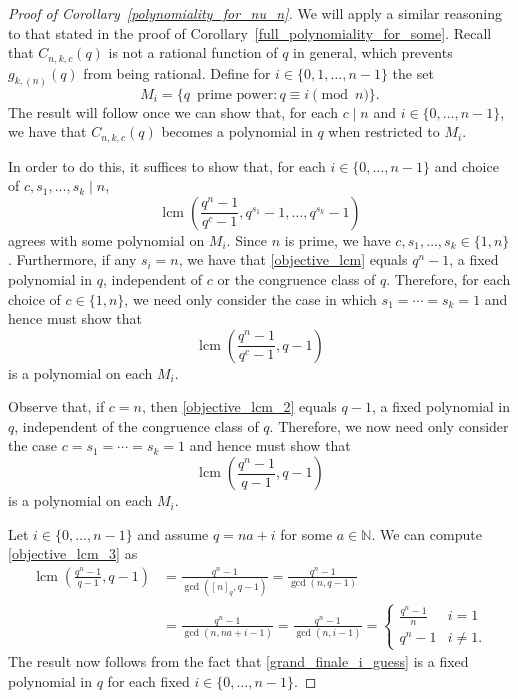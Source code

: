 \documentclass[10pt]{article}
\theoremstyle{definition}
\DeclareMathOperator{\lcm}{lcm}
\newcommand{\N}{\mathbb{N}}
\begin{document}
\begin{proof}[Proof of Corollary~\ref{polynomiality_for_nu_n}]
We will apply a similar reasoning to that stated in the proof of Corollary~\ref{full_polynomiality_for_some}.
Recall that \(C_{n,k,c}(q)\) is not a rational function of \(q\) in general,
which prevents \(g_{k,(n)} (q)\) from being rational.
Define for \(i \in \{0,1,\ldots,n-1\}\) the set
\begin{equation}
M_i = \{ q \, \text{ prime power} : q \equiv i \pmod{n}\}.
\end{equation}
The result will follow once we can show that, for each \(c \mid n\) and \(i \in \{0,\ldots,n-1\}\), we have that \(C_{n,k,c}(q)\) becomes a polynomial in \(q\) when restricted to \(M_i\).

In order to do this, it suffices to show that, for each \(i \in \{0,\ldots,n-1\}\) and choice of \(c, s_1,\ldots,s_k \mid n\),
\begin{equation}
\label{objective_lcm}
\lcm
\left (
\frac{q^n-1}{q^c-1},
q^{s_1} - 1,
\ldots,
q^{s_k} - 1
\right )
\end{equation}
agrees with some polynomial on \(M_i\).
Since \(n\) is prime, we have \(c,s_1,\ldots,s_k \in \{1,n\}\).
Furthermore, if any \(s_i = n\), we have that \eqref{objective_lcm} equals \(q^n-1\), a fixed polynomial in \(q\),
independent of \(c\) or the congruence class of \(q\).
Therefore, for each choice of \(c \in \{1,n\}\), we need only consider the case in which \(s_1 = \cdots = s_k = 1\) and hence must show that
\begin{equation}
\label{objective_lcm_2}
\lcm
\left (
\frac{q^n-1}{q^c-1},
q - 1
\right )
\end{equation}
is a polynomial on each \(M_i\).

Observe that, if \(c = n\), then \eqref{objective_lcm_2} equals \(q-1\), a fixed polynomial in \(q\), independent of the congruence class of \(q\).
Therefore, we now need only consider the case \(c = s_1 = \cdots = s_k = 1\) and hence must show that
\begin{equation}
\label{objective_lcm_3}
\lcm
\left (
\frac{q^n-1}{q-1},
q - 1
\right )
\end{equation}
is a polynomial on each \(M_i\).

Let \(i \in \{0,\ldots,n-1\}\)
and assume \(q = na + i\) for some \(a \in \N\).
We can compute \eqref{objective_lcm_3} as
\begin{align}
\lcm
\left (
\frac{q^n-1}{q-1},
q-1
\right )
& =
\frac{q^n-1}{
\gcd
\left (
[n]_q, q-1
\right )
}
=
\frac{q^n-1}{
\gcd \left (
n,q-1
\right )
} \nonumber \\
& =
\frac{q^n-1}{\gcd(n,na+i-1)}
= \frac{q^n-1}{\gcd(n,i-1)}
=
\begin{cases}
\frac{q^n-1}{n} & i=1 \\
q^n-1           & i \neq 1.
\end{cases}
\label{grand_finale_i_guess}
\end{align}
The result now follows from the fact that \eqref{grand_finale_i_guess} is a fixed polynomial in \(q\) for each fixed \(i \in \{0,\ldots,n-1\}\).
\end{proof}
\end{document}
